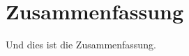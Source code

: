 \documentclass[11pt,a4paper,twoside,headsepline,titlepage,parskip=off,DIV=11,BCOR=12mm,captions=tableheading,chapterprefix=on,numbers=noenddot]{scrbook}
\begin{document}
\chapter*{Zusammenfassung}
Und dies ist die Zusammenfassung.
%
%
%
%
\end{document}

